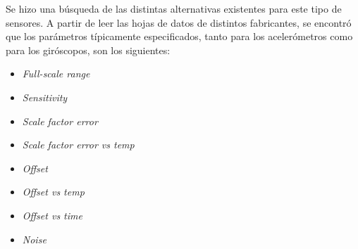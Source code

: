 






Se hizo una búsqueda de las distintas alternativas existentes para este tipo de sensores. A partir de leer las hojas de datos de distintos fabricantes, se encontró que los parámetros típicamente especificados, tanto para los acelerómetros como para los giróscopos, son los siguientes:

\begin{itemize}
    \item \textit{Full-scale range}
    \item \textit{Sensitivity}
    \item \textit{Scale factor error}
    \item \textit{Scale factor error vs temp}
    \item \textit{Offset}
    \item \textit{Offset vs temp}
    \item \textit{Offset vs time}
    \item \textit{Noise}
\end{itemize}

